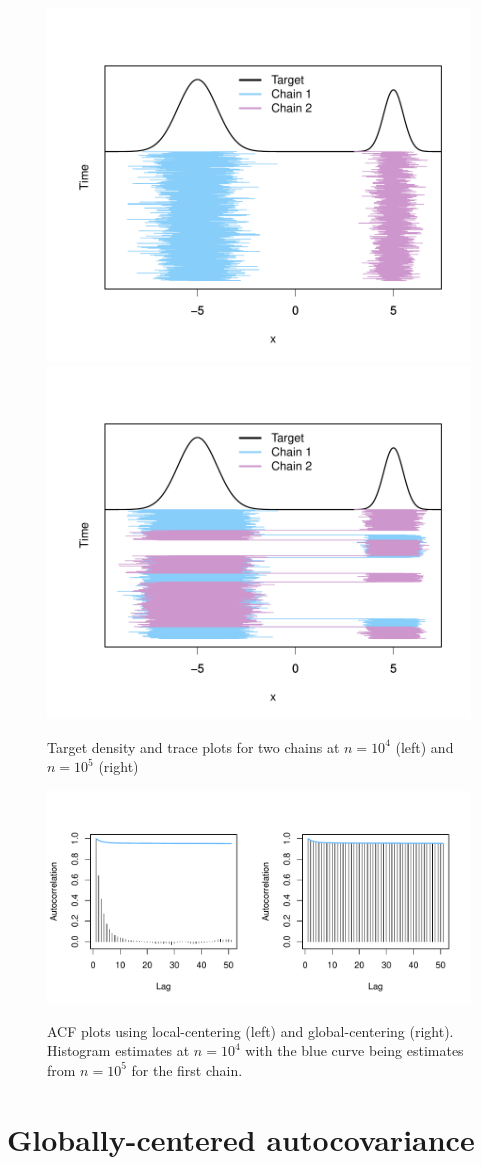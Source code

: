 \documentclass[11pt]{article}
\theoremstyle{remark}
\begin{document}
\begin{figure}[htbp]
\centering
   \includegraphics[width=.35\linewidth]{plots/gaussian-Targettrace_n1e4.pdf}
    \includegraphics[width=.35\linewidth]{plots/gaussian-Targettrace_n1e5.pdf} 
    \caption{Target density and trace plots for two chains at $n = 10^4$ (left) and $n = 10^5$ (right)}
    \label{fig:gaussian-trace}
\end{figure}



\begin{figure}[htbp]
\centering
\includegraphics[width=.6\textwidth]{plots/gaussian-acf_hist.pdf} \\

\caption{ACF plots using local-centering (left) and global-centering (right). Histogram estimates at $n = 10^4$ with the blue curve being estimates from $n = 10^5$ for the first chain.}
\label{fig:gaussian-acf}
\end{figure}


\section{Globally-centered autocovariance} \label{sec:G-ACF}
\end{document}
